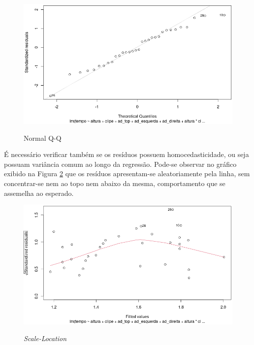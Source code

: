 \begin{figure}[H]
  \caption{Normal Q-Q}
  \center
  \includegraphics[scale=0.48]{images/qq.png}
  \label{fig:qq}
\end{figure}

É necessário verificar também se os resíduos possuem homocedasticidade, ou seja possuam variância comum ao longo da regressão. Pode-se observar no gráfico exibido na Figura \ref{fig:scale} que os resíduos apresentam-se aleatoriamente pela linha, sem concentrar-se nem ao topo nem abaixo da mesma, comportamento que se assemelha ao esperado.

\begin{figure}[H]
  \caption{\textit{Scale-Location}}
  \center 
  \includegraphics[scale=0.48]{images/scale_location.png}
  \label{fig:scale}
\end{figure}

